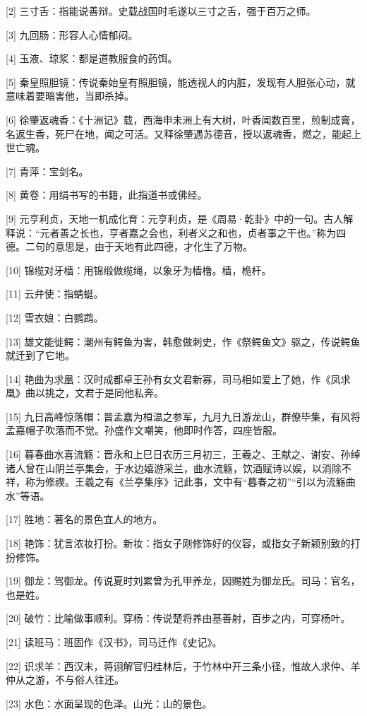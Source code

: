 \documentclass[12pt,UTF8]{ctexbook}
\begin{document}
[2] 三寸舌：指能说善辩。史载战国时毛遂以三寸之舌，强于百万之师。

[3] 九回肠：形容人心情郁闷。

[4] 玉液、琼浆：都是道教服食的药饵。

[5] 秦皇照胆镜：传说秦始皇有照胆镜，能透视人的内脏，发现有人胆张心动，就意味着要暗害他，当即杀掉。

[6] 徐肇返魂香：《十洲记》载，西海申未洲上有大树，叶香闻数百里，煎制成膏，名返生香，死尸在地，闻之可活。又释徐肇遇苏德音，授以返魂香，燃之，能起上世亡魂。

[7] 青萍：宝剑名。

[8] 黄卷：用绢书写的书籍，此指道书或佛经。

[9] 元亨利贞，天地一机成化育：元亨利贞，是《周易·乾卦》中的一句。古人解释说：“元者善之长也，亨者嘉之会也，利者义之和也，贞者事之干也。”称为四德。二句的意思是，由于天地有此四德，才化生了万物。

[10] 锦缆对牙樯：用锦缎做缆绳，以象牙为樯橹。樯，桅杆。

[11] 云弁使：指蜻蜓。

[12] 雪衣娘：白鹦鹉。

[13] 雄文能徙鳄：潮州有鳄鱼为害，韩愈做刺史，作《祭鳄鱼文》驱之，传说鳄鱼就迁到了它地。

[14] 艳曲为求凰：汉时成都卓王孙有女文君新寡，司马相如爱上了她，作《凤求凰》曲以挑之，文君于是同他私奔。

[15] 九日高峰惊落帽：晋孟嘉为桓温之参军，九月九日游龙山，群僚毕集，有风将孟嘉帽子吹落而不觉。孙盛作文嘲笑，他即时作答，四座皆服。

[16] 暮春曲水喜流觞：晋永和上巳日农历三月初三，王羲之、王献之、谢安、孙绰诸人曾在山阴兰亭集会，于水边嬉游采兰，曲水流觞，饮酒赋诗以娱，以消除不祥，称为修禊。王羲之有《兰亭集序》记此事，文中有“暮春之初”“引以为流觞曲水”等语。

[17] 胜地：著名的景色宜人的地方。

[18] 艳饰：犹言浓妆打扮。新妆：指女子刚修饰好的仪容，或指女子新颖别致的打扮修饰。

[19] 御龙：驾御龙。传说夏时刘累曾为孔甲养龙，因赐姓为御龙氏。司马：官名，也是姓。

[20] 破竹：比喻做事顺利。穿杨：传说楚将养由基善射，百步之内，可穿杨叶。

[21] 读班马：班固作《汉书》，司马迁作《史记》。

[22] 识求羊：西汉末，蒋诩解官归桂林后，于竹林中开三条小径，惟故人求仲、羊仲从之游，不与俗人往还。

[23] 水色：水面呈现的色泽。山光：山的景色。
\end{document}
